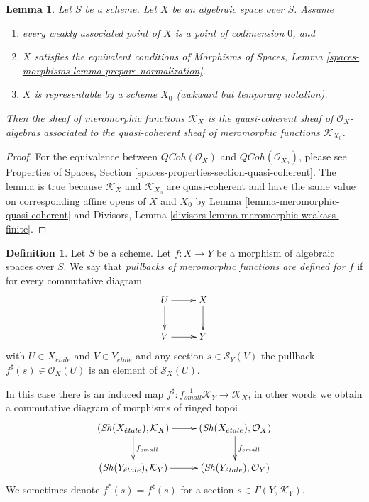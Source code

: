 \documentclass{stacks-project}
\theoremstyle{plain}
\newtheorem{lemma}[subsection]{Lemma}
\theoremstyle{definition}
\newtheorem{definition}[subsection]{Definition}
\theoremstyle{remark}
\numberwithin{equation}{subsection}
\def\Sh{\mathop{\mathit{Sh}}\nolimits}
\def\etale{{\acute{e}tale}}
\def\QCoh{\mathit{QCoh}}
\begin{document}
\begin{lemma}
\label{lemma-meromorphic-quasi-coherent-agree}
Let $S$ be a scheme. Let $X$ be an algebraic space over $S$. Assume
\begin{enumerate}
\item[(a)] every weakly associated point of $X$
is a point of codimension $0$, and
\item[(b)] $X$ satisfies the equivalent conditions
of Morphisms of Spaces, Lemma
\ref{spaces-morphisms-lemma-prepare-normalization}.
\item[(c)] $X$ is representable by a scheme $X_0$
(awkward but temporary notation).
\end{enumerate}
Then the sheaf of meromorphic functions $\mathcal{K}_X$
is the quasi-coherent sheaf of $\mathcal{O}_X$-algebras
associated to the quasi-coherent sheaf of meromorphic
functions $\mathcal{K}_{X_0}$.
\end{lemma}

\begin{proof}
For the equivalence between $\QCoh(\mathcal{O}_X)$ and
$\QCoh(\mathcal{O}_{X_0})$, please see
Properties of Spaces, Section \ref{spaces-properties-section-quasi-coherent}.
The lemma is true because $\mathcal{K}_X$ and $\mathcal{K}_{X_0}$
are quasi-coherent and have the same value on corresponding affine
opens of $X$ and $X_0$ by Lemma \ref{lemma-meromorphic-quasi-coherent} and
Divisors, Lemma \ref{divisors-lemma-meromorphic-weakass-finite}.
\end{proof}

\begin{definition}
\label{definition-pullback-meromorphic-sections}
Let $S$ be a scheme. Let $f : X \to Y$ be a morphism
of algebraic spaces over $S$. We say that {\it pullbacks of meromorphic
functions are defined for $f$} if for every commutative diagram
$$
\xymatrix{
U \ar[r] \ar[d] & X \ar[d] \\
V \ar[r] & Y
}
$$
with $U \in X_\etale$ and $V \in Y_\etale$ and any
section $s \in \mathcal{S}_Y(V)$ the pullback
$f^\sharp(s) \in \mathcal{O}_X(U)$ is an element
of $\mathcal{S}_X(U)$.
\end{definition}

\noindent
In this case there is an induced map
$f^\sharp : f_{small}^{-1}\mathcal{K}_Y \to \mathcal{K}_X$,
in other words we obtain a commutative diagram of morphisms
of ringed topoi
$$
\xymatrix{
(\Sh(X_\etale), \mathcal{K}_X) \ar[r] \ar[d]^{f_{small}} &
(\Sh(X_\etale), \mathcal{O}_X) \ar[d]^{f_{small}} \\
(\Sh(Y_\etale), \mathcal{K}_Y) \ar[r] &
(\Sh(Y_\etale), \mathcal{O}_Y)
}
$$
We sometimes denote $f^*(s) = f^\sharp(s)$ for a
section $s \in \Gamma(Y, \mathcal{K}_Y)$.
\end{document}
